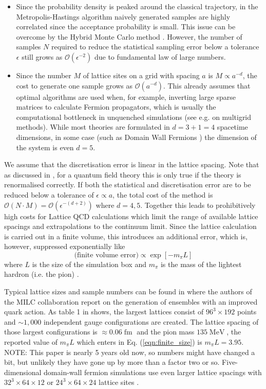 \documentclass[11pt]{article}
\newcommand{\cblue}[1]{{\color{blue}#1}}
\newcommand{\note}[1]{\cblue{NOTE: #1}}
\begin{document}
\begin{itemize}
\item Since the probability density is peaked around the classical trajectory, in the Metropolis-Hastings algorithm naively generated samples are highly correlated since the acceptance probability is small. This issue can be overcome by the Hybrid Monte Carlo method \cite{Duane1987}. However, the number of samples $N$ required to reduce the statistical sampling error below a tolerance $\epsilon$ still grows as $\mathcal{O}(\epsilon^{-2})$ due to fundamental law of large numbers. 
\item Since the number $M$ of lattice sites on a grid with spacing $a$ is $M \propto a^{-d}$, the cost to generate one sample grows as $\mathcal{O}(a^{-d})$. This already assumes that optimal algorithms are used when, for example, inverting large sparse matrices to calculate Fermion propagators, which is usually the computational bottleneck in unquenched simulations (see e.g. \cite{Brannick2008} on multigrid methods). While most theories are formulated in $d=3+1=4$ spacetime dimensions, in some case (such as Domain Wall Fermions \cite{Kaplan1992}) the dimension of the system is even $d=5$.
\end{itemize}
We assume that the discretisation error is linear in the lattice spacing. Note that as discussed in \cite{Lepage1994}, for a quantum field theory this is only true if the theory is renormalised correctly. If both the statistical and discretisation error are to be reduced below a tolerance of $\epsilon\propto a$, the total cost of the method is \mbox{$\mathcal{O}(N\cdot M) = \mathcal{O}(\epsilon^{-(d+2)})$} where $d=4,5$. Together this leads to prohibitively high costs for Lattice QCD calculations which limit the range of available lattice spacings and extrapolations to the continuum limit. Since the lattice calculation is carried out in a finite volume, this introduces an additional error, which is, however, suppressed exponentially like
\begin{equation}
  \text{(finite volume error)} \propto \exp\left[-m_\pi L\right]\label{eqn:finite_size}
\end{equation}
where $L$ is the size of the simulation box and $m_\pi$ is the mass of the lightest hardron (i.e. the pion) \cite{Lepage1994}.

Typical lattice sizes and sample numbers can be found in \cite{Bazavov2013} where the authors of the MILC collaboration report on the generation of ensembles with an improved quark action. As table 1 in \cite{Bazavov2013} shows, the largest lattices consist of $96^3\times 192$ points and $\sim 1,000$ independent gauge configurations are created. The lattice spacing of those largest configurations is $\approx 0.06\operatorname{fm}$ and the pion mass $135 \operatorname{MeV}$, the reported value of $m_\pi L$ which enters in Eq. (\ref{eqn:finite_size}) is $m_\pi L=3.95$.
\note{This paper is nearly 5 years old now, so numbers might have changed a bit, but unlikely they have gone up by more than a factor two or so.}
Five-dimensional domain-wall fermion simulations use even larger lattice spacings with $32^3\times 64\times 12$ or $24^3\times 64\times 24$ lattice sites \cite{Jung2017}.
\end{document}
